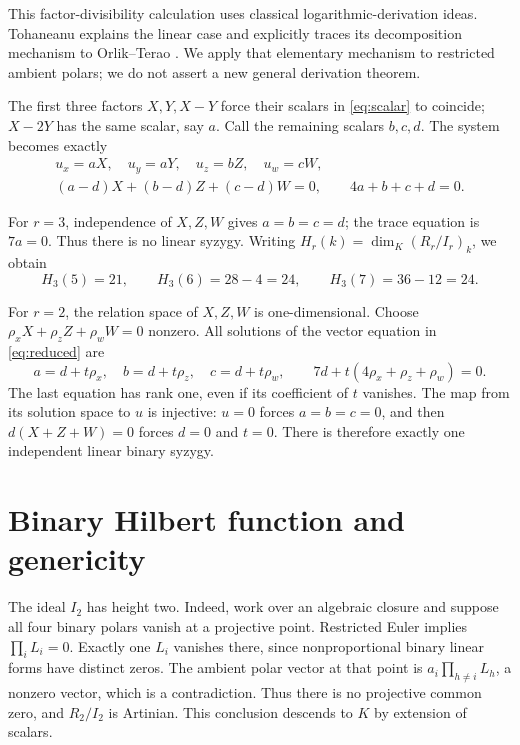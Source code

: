 \documentclass[11pt]{article}
\begin{document}
This factor-divisibility calculation uses classical logarithmic-derivation
ideas. Tohaneanu \cite[\S2.1]{Tohaneanu} explains the linear case and
explicitly traces its decomposition mechanism to Orlik--Terao
\cite[Proposition 4.29(3)]{OT}. We apply that elementary mechanism to
restricted ambient polars; we do not assert a new general derivation theorem.

The first three factors $X,Y,X-Y$ force their scalars in
\eqref{eq:scalar} to coincide; $X-2Y$ has the same scalar, say $a$.
Call the remaining scalars $b,c,d$. The system becomes exactly
\begin{equation}\label{eq:reduced}
 \begin{gathered}
 u_x=aX,\quad u_y=aY,\quad u_z=bZ,\quad u_w=cW,\\
 (a-d)X+(b-d)Z+(c-d)W=0,\qquad 4a+b+c+d=0.
 \end{gathered}
\end{equation}

For $r=3$, independence of $X,Z,W$ gives $a=b=c=d$; the trace equation
is $7a=0$. Thus there is no linear syzygy. Writing
$H_r(k)=\dim_K(R_r/I_r)_k$, we obtain
\begin{equation}\label{eq:H3}
 H_3(5)=21,\qquad H_3(6)=28-4=24,\qquad H_3(7)=36-12=24.
\end{equation}

For $r=2$, the relation space of $X,Z,W$ is one-dimensional. Choose
$\rho_xX+\rho_zZ+\rho_wW=0$ nonzero. All solutions of the vector equation
in \eqref{eq:reduced} are
\[
 a=d+t\rho_x,\quad b=d+t\rho_z,\quad c=d+t\rho_w,
 \qquad 7d+t(4\rho_x+\rho_z+\rho_w)=0.
\]
The last equation has rank one, even if its coefficient of $t$ vanishes.
The map from its solution space to $u$ is injective: $u=0$ forces
$a=b=c=0$, and then $d(X+Z+W)=0$ forces $d=0$ and $t=0$.
There is therefore exactly one independent linear binary syzygy.

\section{Binary Hilbert function and genericity}
The ideal $I_2$ has height two. Indeed, work over an algebraic closure and
suppose all four binary polars vanish at a projective point. Restricted
Euler implies $\prod_iL_i=0$. Exactly one $L_i$ vanishes there, since
nonproportional binary linear forms have distinct zeros. The ambient
polar vector at that point is
$a_i\prod_{h\ne i}L_h$, a nonzero vector, which is a contradiction.
Thus there is no projective common zero, and $R_2/I_2$ is Artinian.
This conclusion descends to $K$ by extension of scalars.
\end{document}

